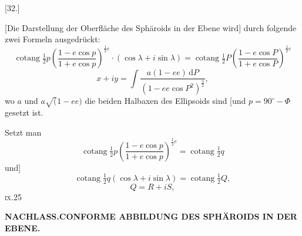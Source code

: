 \begin{center}[32.]\end{center}

[Die Darstellung der Oberfläche des Sphäroids in der Ebene wird] durch folgende zwei Formeln ausgedrückt:
\begin{equation*}
\operatorname{cotang}\tfrac12 p\left(\frac{1-e\cos p}{1+e\cos p}\right)^{\frac12 e}
\cdot(\cos\lambda+i\sin\lambda)
=\operatorname{cotang}\tfrac12 P\left(\frac{1-e\cos P}{1+e\cos P}\right)^{\frac12 e}
\tag*{1)}
\end{equation*}
\begin{equation*}
x+iy=\int\frac{a(1-ee)\,\mathrm dP}{(1-ee\cos P^2)^{\frac32}},
\tag*{2)}
\end{equation*}
\noindent wo \(a\) und \(a\surd(1-ee)\) die beiden Halbaxen des Ellipsoids sind
[und \(p=90^\circ-\Phi\) gesetzt ist.

Setzt man
\[
\operatorname{cotang}\tfrac12 p\left(\frac{1-e\cos p}{1+e\cos p}\right)^{\frac12 e}
=\operatorname{cotang}\tfrac12 q
\]
\noindent und]
\[
\operatorname{cotang}\tfrac12 q(\cos\lambda+i\sin\lambda)=\operatorname{cotang}\tfrac12 Q,
\]
\noindent [sowie]
\[
Q=R+iS,
\]
\noindent\textsc{ix.}\hfill 25\hspace*{.12\linewidth}\par

\par\clearpage
\noindent{}\hfill{\small\textbf{NACHLASS.\quad CONFORME ABBILDUNG DES SPHÄROIDS IN DER EBENE.}}\hfill\null\par\medskip

